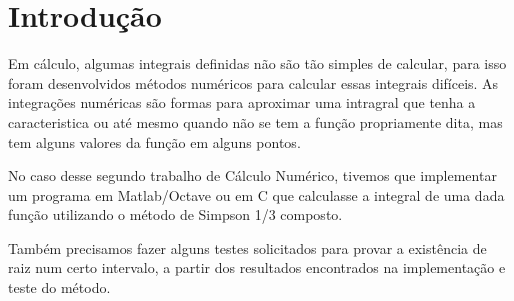 \chapter*[Introdução]{Introdução}
Em cálculo, algumas integrais definidas não são tão simples de calcular, para
isso foram desenvolvidos métodos numéricos para calcular essas integrais
difíceis. As integrações numéricas são formas para aproximar uma intragral que
tenha a caracteristica ou até mesmo quando não se tem a função propriamente
dita, mas tem alguns valores da função em alguns pontos.

No caso desse segundo trabalho de Cálculo Numérico, tivemos que implementar um
programa em Matlab/Octave ou em C que calculasse a integral de uma dada função
utilizando o método de Simpson 1/3 composto.

Também precisamos fazer alguns testes solicitados para provar a existência de
raiz num certo intervalo, a partir dos resultados encontrados na implementação e
teste do método.

